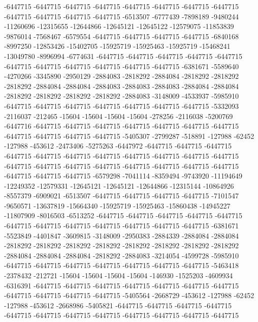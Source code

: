 -6447715 -6447715 -6447715 -6447715 -6447715 -6447715 -6447715 -6447715 -6447715 -6447715 -6447715 -6447715 -6513507 -6777439 -7898189 -9480244 -11260696 -12315655 -12644866 -12645121 -12645122 -12579075 -11853839 -9876014 -7568467 -6579554 -6447715 -6447715 -6447715 -6447715 -6840168 -8997250 -12853426 -15402705 -15925719 -15925463 -15925719 -15468241 -13049780 -8996994 -6774631 -6447715 -6447715 -6447715 -6447715 -6447715 -6447715 -6447715 -6447715 -6447715 -6447715 -6447715 -6381671 -5589640 -4270266 -3345890 -2950129 -2884083 -2818292 -2884084 -2818292 -2818292 -2818292 -2884084 -2884084 -2884083 -2884083 -2884083 -2884084 -2884084 -2818292 -2818292 -2818292 -2818292 -2884083 -3148009 -4533937 -5985910 -6447715 -6447715 -6447715 -6447715 -6447715 -6447715 -6447715 -5332093 -2116037 -212465 -15604 -15604 -15604 -15604 -278256 -2116038 -5200769 -6447716 -6447715 -6447715 -6447715 -6447715 -6447715 -6447715 -6447715 -6447715 -6447715 -6447715 -6447715 -5405307 -2799287 -518891 -127988 -62452 -127988 -453612 -2473406 -5275263 -6447972 -6447715 -6447715 -6447715 -6447715 -6447715 -6447715 -6447715 -6447715 -6447715 -6447715 -6447715
-6447715 -6447715 -6447715 -6447715 -6447715 -6447715 -6447715 -6447715 -6447715 -6447715 -6447715 -6579298 -7041114 -8359494 -9743920 -11194649 -12249352 -12579331 -12645121 -12645121 -12644866 -12315144 -10864926 -8557379 -6909021 -6513507 -6447715 -6447715 -6447715 -6447715 -7101547 -9650571 -13637819 -15664340 -15925719 -15925463 -15860438 -14945227 -11807909 -8016503 -6513252 -6447715 -6447715 -6447715 -6447715 -6447715 -6447715 -6447715 -6447715 -6447715 -6447715 -6447715 -6447715 -6381671 -5523849 -4401847 -3609815 -3148009 -2950383 -2884339 -2884084 -2884084 -2818292 -2818292 -2818292 -2818292 -2818292 -2818292 -2818292 -2818292 -2884084 -2884084 -2884084 -2818292 -2884083 -3214054 -4599728 -5985910 -6447715 -6447715 -6447715 -6447715 -6447715 -6447715 -6447715 -5463418 -2378432 -212721 -15604 -15604 -15604 -15604 -146930 -1525203 -4609934 -6316391 -6447715 -6447715 -6447715 -6447715 -6447715 -6447715 -6447715 -6447715 -6447715 -6447715 -6447715 -5405564 -2668729 -453612 -127988 -62452 -127988 -453612 -2668986 -5405821 -6447715 -6447715 -6447715 -6447715 -6447715 -6447715 -6447715 -6447715 -6447715 -6447715 -6447715 -6447715
